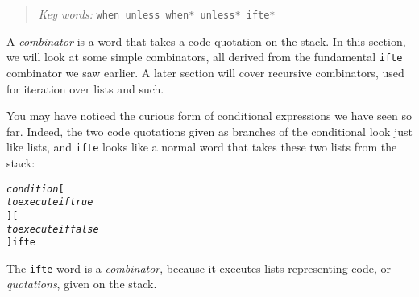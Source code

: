 \documentclass[english]{book}
\newcommand{\chapkeywords}[1]{{\parbox{10cm}{\begin{minipage}[b]{10cm}
\begin{quote}
\emph{Key words:} \texttt{#1}
\end{quote}
\end{minipage}}}}
\begin{document}
\chapkeywords{when unless when* unless* ifte*}

A \emph{combinator} is a word that takes a code quotation on the stack. In this section, we will look at some simple combinators, all derived from the fundamental \texttt{ifte} combinator we saw earlier. A later section will cover recursive combinators, used for iteration over lists and such.

You may have noticed the curious form of conditional expressions we have seen so far. Indeed, the two code quotations given as branches of the conditional look just like lists, and \texttt{ifte} looks like a normal word that takes these two lists from the stack:

\begin{alltt}
\emph{condition} {[}
    \emph{to execute if true}
{] [}
    \emph{to execute if false}
{]} ifte
\end{alltt}

The \texttt{ifte} word is a \emph{combinator}, because it executes lists representing code, or \emph{quotations}, given on the stack.

%
%
%
%
\end{document}
